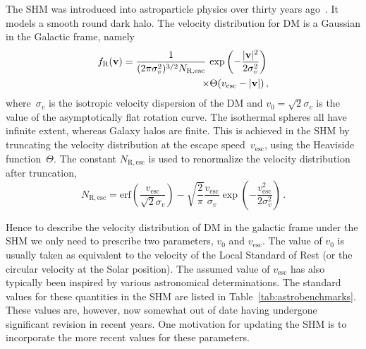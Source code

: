 \documentclass[prd,10pt,twocolumn,showpacs,nofootinbib, aps,superscriptaddress,preprintnumbers]{revtex4-1}
\newcommand{\vesc}{v_\mathrm{esc}}
\newcommand{\erf}{\mathrm{erf}}
\newcommand{\vbf}{\mathbf{v}}
\newcommand{\fR}{f_{\rm R}}
\begin{document}
The SHM was introduced into astroparticle physics over thirty years
ago~\citep{Dr86}. It models a smooth round dark halo. The
velocity distribution for DM is a Gaussian in the Galactic frame, namely
%
\begin{align}\label{eq:shm}
\fR(\vbf) = \frac{1}{(2\pi
  \sigma_v^2)^{3/2}N_\mathrm{R,esc}} \, \exp \left( - \frac{|\vbf|^2}{2\sigma_v^2}\right) \,
\nonumber\\ \times \Theta (\vesc - |\vbf|)\,,
\end{align}
%
where~$\sigma_v$ is the isotropic velocity dispersion of the DM and
$v_0 = \sqrt{2} \sigma_v$ is the value of the asymptotically flat
rotation curve.  The isothermal spheres all have infinite extent,
whereas Galaxy halos are finite. This is achieved in the SHM by
truncating the velocity distribution at the escape speed~$\vesc$,
using the Heaviside function~$\Theta$. The constant $N_\mathrm{R,
  esc}$ is used to renormalize the velocity distribution after
truncation,
%
\begin{equation}\label{eq:norm}
N_\mathrm{R,esc} = \erf \left( \frac{\vesc}{\sqrt{2}\sigma_v}\right) -
\sqrt{\frac{2}{\pi}} \frac{\vesc}{\sigma_v} \exp \left(
-\frac{\vesc^2}{2\sigma_v^2} \right)\,.
\end{equation}

Hence to describe the velocity distribution of DM in the galactic
frame under the SHM we only need to prescribe two parameters, $v_0$
and $\vesc$. The value of $v_0$ is usually taken as equivalent to the
velocity of the Local Standard of Rest (or the circular velocity at
the Solar position). The assumed value of $\vesc$ has also typically
been inspired by various astronomical determinations.  The standard
values for these quantities in the SHM are listed in
Table~\ref{tab:astrobenchmarks}. These values are, however,
now somewhat out of date having undergone significant revision in
recent years. One motivation for updating the SHM is to
incorporate the more recent values for these parameters.
\end{document}
